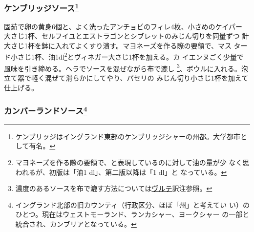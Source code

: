 \begin{recette}
\hypertarget{cambridge-sauce}{%
\subsubsection[ケンブリッジソース]{\texorpdfstring{ケンブリッジソース\footnote{ケンブリッジはイングランド東部のケンブリッジシャーの州都。大学都市として有名。}}{ケンブリッジソース}}\label{cambridge-sauce}}



固茹で卵の黄身6個と、よく洗ったアンチョビのフィレ4枚、小さめのケイパー
大さじ1杯、セルフイユとエストラゴンとシブレットのみじん切りを同量ずつ
計大さじ1杯を鉢に入れてよくすり潰す。マヨネーズを作る際の要領で、マス
タード小さじ1杯、油1\undemi{}dl\footnote{マヨネーズを作る際の要領で、と表現しているのに対して油の量が少
  なく思われるが、初版は「油1 dl」、第二版以降は「1\undemi{} dl」と
  なっている。}とヴィネガー大さじ1杯を加える。カ
イエンヌごく少量で風味を引き締める。ヘラでソースを混ぜながら布で漉し
\footnote{濃度のあるソースを布で漉す方法については\protect\hyperlink{veloute}{ヴルテ}訳注参照。}、ボウルに入れる。泡立て器で軽く混ぜて滑らかにしてやり、パセリの
みじん切り小さじ1杯を加えて仕上げる。

\hypertarget{cumberland-sauce}{%
\subsubsection[カンバーランドソース]{\texorpdfstring{カンバーランドソース\footnote{イングランド北部の旧カウンティ（行政区分、ほぼ「州」と考えてい
  い）のひとつ。現在はウェストモーランド、ランカシャー、ヨークシャー
  の一部と統合され、カンブリアとなっている。}}{カンバーランドソース}}\label{cumberland-sauce}}


\end{recette}
